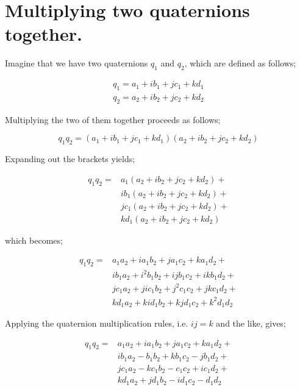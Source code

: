 \documentclass[12pt, a4paper]{article}
\begin{document}

\newpage

\section{Multiplying two quaternions together.}

Imagine that we have two quaternions \(q_{1}\) and \(q_{2}\), which are defined
as follows;

\begin{align*}
q_{1} = a_{1} + ib_{1} + jc_{1} + kd_{1} \\
q_{2} = a_{2} + ib_{2} + jc_{2} + kd_{2}
\end{align*}

Multiplying the two of them together proceeds as follows;

\begin{equation*}
q_{1}q_{2} = (a_{1} + ib_{1} + jc_{1} + kd_{1})(a_{2} + ib_{2} + jc_{2} + kd_{2})
\end{equation*}

Expanding out the brackets yields;

\begin{align*}
q_{1}q_{2} = &a_{1}(a_{2}  + ib_{2} + jc_{2} + kd_{2}) + \\
             &ib_{1}(a_{2} + ib_{2} + jc_{2} + kd_{2}) + \\
             &jc_{1}(a_{2} + ib_{2} + jc_{2} + kd_{2}) + \\
             &kd_{1}(a_{2} + ib_{2} + jc_{2} + kd_{2})
\end{align*}

which becomes;

\begin{align*}
q_{1}q_{2} = &a_{1}a_{2}   + ia_{1}b_{2}     + ja_{1}c_{2}     + ka_{1}d_{2}  + \\
             &ib_{1}a_{2}  + i^{2}b_{1}b_{2} + ijb_{1}c_{2}    + ikb_{1}d_{2} + \\
             &jc_{1}a_{2}  + jic_{1}b_{2}    + j^{2}c_{1}c_{2} + jkc_{1}d_{2} + \\
             &kd_{1}a_{2}  + kid_{1}b_{2}    + kjd_{1}c_{2}    + k^{2}d_{1}d_{2}
\end{align*}

Applying the quaternion multiplication rules, i.e. \(ij = k\) and the
like, gives;

\begin{align*}
q_{1}q_{2} = &a_{1}a_{2}  + ia_{1}b_{2} + ja_{1}c_{2} + ka_{1}d_{2} + \\
             &ib_{1}a_{2} - b_{1}b_{2}  + kb_{1}c_{2} - jb_{1}d_{2} + \\
             &jc_{1}a_{2} - kc_{1}b_{2} - c_{1}c_{2}  + ic_{1}d_{2} + \\
             &kd_{1}a_{2} + jd_{1}b_{2} - id_{1}c_{2} - d_{1}d_{2}
\end{align*}
\end{document}
